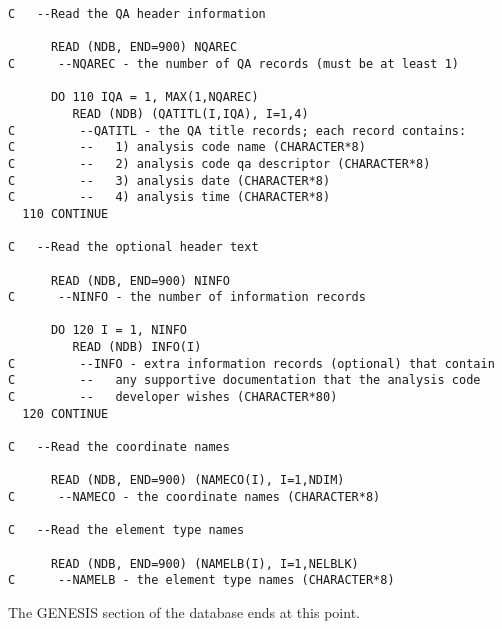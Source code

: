 \begin{verbatim}
C   --Read the QA header information

      READ (NDB, END=900) NQAREC
C      --NQAREC - the number of QA records (must be at least 1)

      DO 110 IQA = 1, MAX(1,NQAREC)
         READ (NDB) (QATITL(I,IQA), I=1,4)
C         --QATITL - the QA title records; each record contains:
C         --   1) analysis code name (CHARACTER*8)
C         --   2) analysis code qa descriptor (CHARACTER*8)
C         --   3) analysis date (CHARACTER*8)
C         --   4) analysis time (CHARACTER*8)
  110 CONTINUE

C   --Read the optional header text

      READ (NDB, END=900) NINFO
C      --NINFO - the number of information records

      DO 120 I = 1, NINFO
         READ (NDB) INFO(I)
C         --INFO - extra information records (optional) that contain
C         --   any supportive documentation that the analysis code
C         --   developer wishes (CHARACTER*80)
  120 CONTINUE

C   --Read the coordinate names

      READ (NDB, END=900) (NAMECO(I), I=1,NDIM)
C      --NAMECO - the coordinate names (CHARACTER*8)

C   --Read the element type names

      READ (NDB, END=900) (NAMELB(I), I=1,NELBLK)
C      --NAMELB - the element type names (CHARACTER*8)
\end{verbatim}

The GENESIS section of the database ends at this point.

